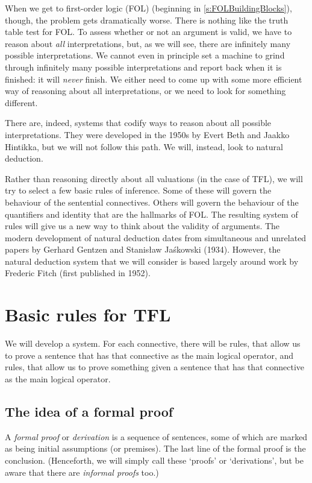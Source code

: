 When we get to first-order logic (FOL) (beginning in \cref{s:FOLBuildingBlocks}), though, the problem gets dramatically worse. There is nothing like the truth table test for FOL. To assess whether or not an argument is valid, we have to reason about \emph{all} interpretations, but, as we will see, there are infinitely many possible interpretations. We cannot even in principle set a machine to grind through infinitely many possible interpretations and report back when it is finished: it will \emph{never} finish. We either need to come up with some more efficient way of reasoning about all interpretations, or we need to look for something different.

There are, indeed, systems that codify ways to reason about all possible interpretations. They were developed in the 1950s by Evert Beth and Jaakko Hintikka, but we will not follow this path. We will, instead, look to natural deduction.

Rather than reasoning directly about all valuations (in the case of TFL), we will try to select a few basic rules of inference. Some of these will govern the behaviour of the sentential connectives. Others will govern the behaviour of the quantifiers and identity that are the hallmarks of FOL. The resulting system of rules will give us a new way to think about the validity of arguments.
The modern development of natural deduction dates from simultaneous and unrelated papers by Gerhard Gentzen and Stanis\l{}aw Ja\'{s}kowski (1934). However, the natural deduction system that we will consider is based largely around work by Frederic Fitch (first published in 1952).



\chapter{Basic rules for TFL}\label{s:BasicTFL}
We will develop a  system. For each connective, there will be  rules, that allow us to prove a sentence that has that connective as the main logical operator, and  rules, that allow us to prove something given a sentence that has that connective as the main logical operator.

\section{The idea of a formal proof}
A \emph{formal proof} or \emph{derivation} is a sequence of sentences,
some of which are marked as being initial assumptions (or premises).
The last line of the formal proof is the conclusion. (Henceforth, we
will simply call these `proofs' or `derivations', but be aware that
there are \emph{informal proofs} too.)

